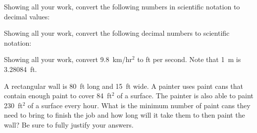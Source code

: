 \documentclass[12pt,letterpaper]{exam}
\begin{document}
\begin{questions}
\newpage
\question Showing all your work, convert the following numbers in scientific notation to decimal values:



\newpage
\question Showing all your work, convert the following decimal numbers to scientific notation: 



\newpage
\question[10] Showing all your work, convert 9.8~km/hr$^2$ to ft per second. Note that 1~m is 3.28084~ft.



\newpage
\question[10] A rectangular wall is 80~ft long and 15~ft wide. A painter uses paint cans that contain enough paint to cover 84~ft$^2$ of a surface. The painter is also able to paint 230~ft$^2$ of a surface every hour. What is the minimum number of paint cans they need to bring to finish the job and how long will it take them to then paint the wall? Be sure to fully justify your answers. 


\end{questions}
\end{document}
